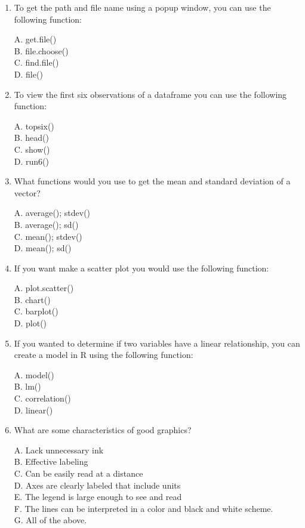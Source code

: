 \documentclass[12pt]{article}\usepackage[]{graphicx}\usepackage[]{color}
\begin{document}
\begin{enumerate}
\item To get the path and file name using a popup window, you can use the following function:

A. get.file() \\
B. file.choose() \\
C. find.file() \\
D. file() 

\item To view the first six observations of a dataframe you can use the following function:

A. topsix() \\
B. head() \\
C. show() \\
D. run6() 

\item What functions would you use to get the mean and standard deviation of a vector?

A. average(); stdev() \\
B. average(); sd() \\
C. mean(); stdev() \\
D. mean(); sd() 

\item If you want make a scatter plot you would use the following function:

A. plot.scatter() \\
B. chart() \\
C. barplot() \\
D. plot() 

\item If you wanted to determine if two variables have a linear relationship, you can create a model in R using the following function:

A. model() \\
B. lm() \\
C. correlation() \\
D. linear()

\item What are some characteristics of good graphics?

A. Lack unnecessary ink \\
B. Effective labeling \\
C. Can be easily read at a distance \\
D. Axes are clearly labeled that include units\\
E. The legend is large enough to see and read\\
F. The lines can be interpreted in a color and black and white scheme. \\
G. All of the above. 



\end{enumerate}
\end{document}
